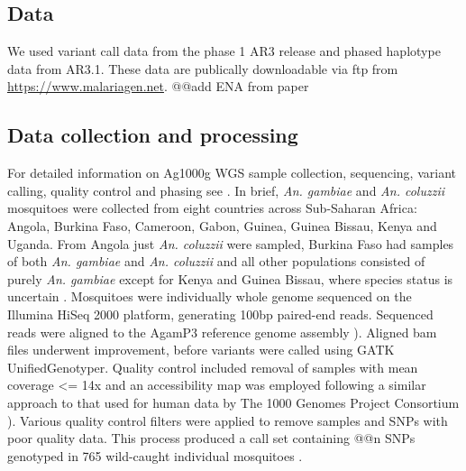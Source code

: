 \documentclass[a4paper,11pt,abstracton,hidelinks]{scrartcl}
\begin{document}
\subsection*{Data}

%
We used variant call data from the phase 1 AR3 release and phased haplotype data from AR3.1. These data are publically downloadable via ftp from \url{https://www.malariagen.net}. 
%
@@add ENA from paper


\subsection*{Data collection and processing}

%
For detailed information on Ag1000g WGS sample collection, sequencing, variant calling, quality control and phasing see \cite{Ag1000gConsortium2017}.
%
In brief, \emph{An. gambiae} and \emph{An. coluzzii} mosquitoes were collected from eight countries across Sub-Saharan Africa: Angola, Burkina Faso, Cameroon, Gabon, Guinea, Guinea Bissau, Kenya and Uganda. 
%
From Angola just \emph{An. coluzzii} were sampled, Burkina Faso had samples of both \emph{An. gambiae} and \emph{An. coluzzii} and all other populations consisted of purely \emph{An. gambiae} except for Kenya and Guinea Bissau, where species status is uncertain \cite{Ag1000gConsortium2017}.
%
Mosquitoes were individually whole genome sequenced on the Illumina HiSeq 2000 platform, generating 100bp paired-end reads. 
%
Sequenced reads were aligned to the \cite{An. gambiae} AgamP3 reference genome assembly \cite{Holt2002}). 
%
Aligned bam files underwent improvement, before variants were called using GATK UnifiedGenotyper. 
%
Quality control included removal of samples with mean coverage <= 14x and an accessibility map was employed following a similar approach to that used for human data by The 1000 Genomes Project Consortium \cite{The1000GenomesProjectConsortium2010}). 
%
Various quality control filters were applied to remove samples and SNPs with poor quality data. 
%
This process produced a call set containing @@n SNPs genotyped in 765 wild-caught individual mosquitoes \cite{Ag1000gConsortium2017}.
\end{document}
